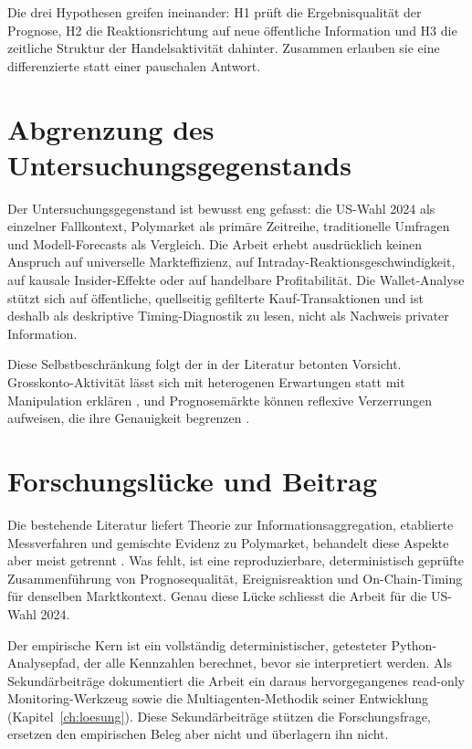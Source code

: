 Die drei Hypothesen greifen ineinander: H1 prüft die Ergebnisqualität der Prognose,
H2 die Reaktionsrichtung auf neue öffentliche Information und H3 die zeitliche
Struktur der Handelsaktivität dahinter. Zusammen erlauben sie eine differenzierte
statt einer pauschalen Antwort.

\section{Abgrenzung des Untersuchungsgegenstands}
Der Untersuchungsgegenstand ist bewusst eng gefasst: die US-Wahl 2024 als einzelner
Fallkontext, Polymarket als primäre Zeitreihe, traditionelle Umfragen und
Modell-Forecasts als Vergleich. Die Arbeit erhebt ausdrücklich keinen Anspruch auf
universelle Markteffizienz, auf Intraday-Reaktionsgeschwindigkeit, auf kausale
Insider-Effekte oder auf handelbare Profitabilität. Die Wallet-Analyse stützt sich
auf öffentliche, quellseitig gefilterte Kauf-Transaktionen und ist deshalb als
deskriptive Timing-Diagnostik zu lesen, nicht als Nachweis privater Information.

Diese Selbstbeschränkung folgt der in der Literatur betonten Vorsicht.
Grosskonto-Aktivität lässt sich mit heterogenen Erwartungen statt mit Manipulation
erklären \citep{zotero_poly_001}, und Prognosemärkte können reflexive Verzerrungen
aufweisen, die ihre Genauigkeit begrenzen \citep{zotero_poly_009}.

\section{Forschungslücke und Beitrag}
Die bestehende Literatur liefert Theorie zur Informationsaggregation, etablierte
Messverfahren und gemischte Evidenz zu Polymarket, behandelt diese Aspekte aber
meist getrennt \citep{zotero_poly_002,zotero_poly_007}. Was fehlt, ist eine
reproduzierbare, deterministisch geprüfte Zusammenführung von Prognosequalität,
Ereignisreaktion und On-Chain-Timing für denselben Marktkontext. Genau diese Lücke
schliesst die Arbeit für die US-Wahl 2024.

Der empirische Kern ist ein vollständig deterministischer, getesteter
Python-Analysepfad, der alle Kennzahlen berechnet, bevor sie interpretiert werden.
Als Sekundärbeiträge dokumentiert die Arbeit ein daraus hervorgegangenes read-only
Monitoring-Werkzeug sowie die Multiagenten-Methodik seiner Entwicklung
(Kapitel~\ref{ch:loesung}). Diese Sekundärbeiträge stützen die Forschungsfrage,
ersetzen den empirischen Beleg aber nicht und überlagern ihn nicht.

